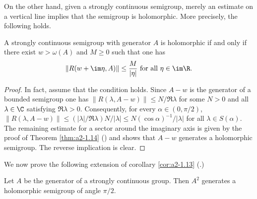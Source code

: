 On the other hand, given a strongly continuous semigroup, merely an estimate on a vertical line implies that the semigroup is holomorphic.
More precisely, the following holds.
\begin{corollary*}\label{cor:a2-1.14-kgk}
A strongly continuous semigroup with generator $A$ is holomorphic if and only if there exist $w > \omega(A)$ and $M \geq 0$ such that one has
\[
    \|R(w+\im\eta,A)\| \leq \frac{M}{|\eta|} \text{ for all } \eta \in \im\R.
\]
\end{corollary*}

\begin{proof}
In fact, assume that the condition holds.
Since $A-w$ is the generator of a bounded semigroup one has 
$\|R(\lambda,A-w)\| \leq N/\Re\lambda$ for some $N > 0$ and all $\lambda \in \C$ 
satisfying $\Re\lambda > 0$.
Consequently, for every $\alpha \in (0,\pi/2)$, $\|R(\lambda,A-w)\| \leq (|\lambda|/\Re\lambda)N/|\lambda| \leq N(\cos\alpha)^{-1}/|\lambda|$ for all $\lambda \in S(\alpha)$.
The remaining estimate for a sector around the imaginary axis is given by the proof of Theorem \ref{thm:a2-1.14}  () 
and shows that $A-w$ generates a holomorphic semigroup.
The reverse implication is clear.
\end{proof}

We now prove the following extension of corollary \ref{cor:a2-1.13} (.)

\begin{theorem}\label{thm:a2-1.15}
Let $A$ be the generator of a strongly continuous group.
Then $A^2$ generates a holomorphic semigroup of angle $\pi/2$.
\end{theorem}


